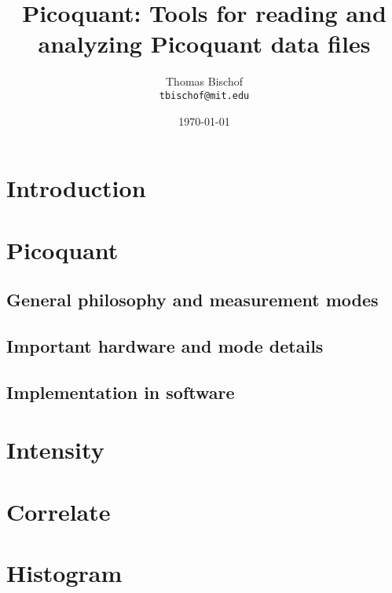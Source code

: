 \documentclass{article}
\title{Picoquant: Tools for reading and analyzing Picoquant data files}
\author{Thomas Bischof \\ \texttt{tbischof@mit.edu}}
\date{\today}
\begin{document}
\maketitle
\tableofcontents
 
\section{Introduction}


\section{Picoquant}
\subsection{General philosophy and measurement modes}

\subsection{Important hardware and mode details}

\subsection{Implementation in software}

\section{Intensity}


\section{Correlate}

\section{Histogram}
\end{document}
